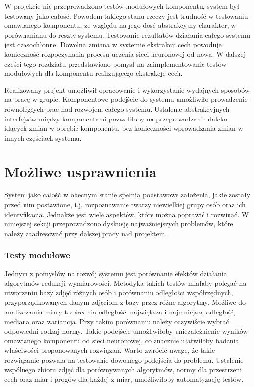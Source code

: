 \documentclass[oneside, eng]{mgr}
\begin{document}
W projekcie nie przeprowadzono testów modułowych komponentu, system był testowany jako całość. Powodem takiego stanu rzeczy jest trudność w testowaniu omawianego komponentu, ze względu na jego dość abstrakcyjny charakter, w porównanianu do reszty systemu. Testowanie rezultatów działania całego systemu jest czasochłonne. Dowolna zmiana w systemie ekstrakcji cech powoduje konieczność rozpoczynania procesu uczenia sieci neuronowej od nowa. W dalszej części tego rozdziału przedstawiono pomysł na zaimplementowanie testów modułowych dla komponentu realizującego ekstrakcję cech.

Realizowany projekt umożliwił opracowanie i wykorzystanie wydajnych sposobów na pracę w grupie. Komponentowe podejście do systemu umożliwiło prowadzenie równoległych prac nad rozwojem całego systemu. Ustalenie abstrakcyjnych interfejsów między komponentami pozwoliłoby na przeprowadzanie daleko idących zmian w obrębie komponentu, bez konieczności wprowadzania zmian w innych częściach systemu.

\section{Możliwe usprawnienia}

System jako całość w obecnym stanie spełnia podstawowe założenia, jakie zostały przed nim postawione, t.j. rozpoznawanie twarzy niewielkiej grupy osób oraz ich identyfikacja. Jednakże jest wiele aspektów, które można poprawić i rozwinąć. W niniejszej sekcji przeprowadzono dyskusję najważniejszych problemów, które należy zaadresować przy dalszej pracy nad projektem.

\subsubsection{Testy modułowe}

Jednym z pomysłów na rozwój systemu jest porównanie efektów działania algorytmów redukcji wymiarowości. Metodyka takich testów miałaby polegać na utworzeniu bazy zdjęć różnych osób i porównaniu odległości współrzędnych, przyporządkowanych danym zdjęciom z bazy przez różne algorytmy. Możliwe do analizowania miary to: średnia odległość, największa i najmniejsza odległość, mediana oraz wariancja. Przy takim porównaniu należy oczywiście wybrać odpowiedni rodzaj normy. Takie podejście umożliwiłoby uniezależnienie wyników omawianego komponentu od sieci neuronowej, co znacznie ułatwiłoby badania właściwości proponowanych rozwiązań. Warto zwrócić uwagę, że takie rozwiązanie pozwala na testowanie dowolnego podejścia do problemu. Ustalenie wspólnego zbioru zdjęć dla porównywanych algorytmów, normy dla przestrzeni cech oraz miar i progów dla każdej z miar, umożliwiłoby automatyzację testów.
\end{document}
